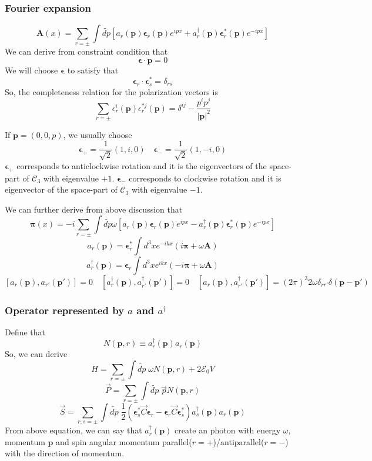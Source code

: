 \subsubsection{Fourier expansion}
\[\bm{A}(x) = \sum_{r = \pm} \int \widetilde{dp} [a_{r}(\bm{p}) \bm{\epsilon}_r(\bm{p})e^{ipx} + a^{\dagger}_{r}(\bm{p}) \bm{\epsilon}^*_r(\bm{p})e^{-ipx}]\]
We can derive from constraint condition that
\[\bm{\epsilon} \cdot \bm{p} = 0\]
We will choose $\bm{\epsilon}$ to satisfy that
\[\bm{\epsilon}_r \cdot \bm{\epsilon}^*_s = \delta_{rs}\]
So, the completeness relation for the polarization vectors is
\[\sum_{r=\pm} \epsilon_r^i(\bm{p}) \epsilon_r^{*j}(\bm{p}) = \delta^{ij} - \frac{p^ip^j}{|\bm{p}|^2}\]
\begin{example}
If $\bm{p} = (0,0,p)$, we usually choose 
\[\bm{\epsilon}_{+} = \frac{1}{\sqrt{2}}(1,i,0) \quad \bm{\epsilon}_{-} = \frac{1}{\sqrt{2}}(1,-i,0) \]
$\bm{\epsilon}_{+}$ corresponds to anticlockwise rotation and it is the eigenvectors of the space-part of $\mathcal{C}_3$ with eigenvalue $+1$. $\bm{\epsilon}_{-}$ corresponds to clockwise rotation and it is eigenvector of the space-part of $\mathcal{C}_3$ with eigenvalue $- 1$.
\end{example}
\noindent
We can further derive from above discussion that
\[\bm{\pi}(x) = -i \sum_{r = \pm} \int \widetilde{dp} \omega [a_{r}(\bm{p}) \bm{\epsilon}_r(\bm{p})e^{ipx} - a^{\dagger}_{r}(\bm{p}) \bm{\epsilon}^*_r(\bm{p})e^{-ipx}]\]
\[a_r(\bm{p}) = \bm{\epsilon}^*_r \int d^3x e^{-ikx}(i\bm{\pi}+\omega\bm{A})\]
\[a^{\dagger}_r(\bm{p}) = \bm{\epsilon}_r \int d^3x e^{ikx}(-i\bm{\pi}+\omega\bm{A})\]
\[[a_r(\bm{p}),a_{r'}(\bm{p'})] = 0 \quad [a^{\dagger}_r(\bm{p}),a^{\dagger}_{r'}(\bm{p'})] = 0 \quad [a_r(\bm{p}),a^{\dagger}_{r'}(\bm{p'})] = (2\pi)^3 2\omega \delta_{rr'} \delta(\bm{p} - \bm{p}')\]

\subsubsection{Operator represented by $a$ and $a^{\dagger}$}
\noindent
Define that
\[N(\bm{p},r) \equiv a^{\dagger}_{r}(\bm{p}) a_r(\bm{p})\]
So, we can derive
\[H = \sum_{r = \pm} \int \widetilde{dp} \; \omega N(\bm{p},r) + 2\mathcal{E}_0V\]
\[\vec{P} = \sum_{r = \pm} \int \widetilde{dp} \; \vec{p} N(\bm{p},r) \]
\[\vec{S} = \sum_{r,s = \pm} \int \widetilde{dp} \; \frac{1}{2}(\bm{\epsilon}^*_{s} \vec{C}\bm{\epsilon}_{r} - \bm{\epsilon}_{r} \vec{C}\bm{\epsilon}^*_{s}) a^{\dagger}_{s}(\bm{p}) a_r(\bm{p})\]
From above equation, we can say that $a^{\dagger}_r(\bm{p})$ create an photon with energy $\omega$, momentum $\bm{p}$ and spin angular momentum parallel($r=+$)/antiparallel($r=-$) with the direction of momentum.


